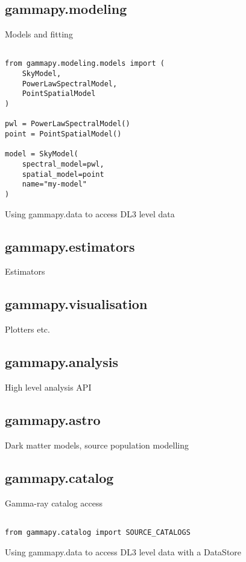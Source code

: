 \subsection{gammapy.modeling}
Models and fitting

\begin{listing}
\begin{verbatim}

from gammapy.modeling.models import (
	SkyModel,
	PowerLawSpectralModel,
	PointSpatialModel
)

pwl = PowerLawSpectralModel()
point = PointSpatialModel()

model = SkyModel(
	spectral_model=pwl,
	spatial_model=point
	name="my-model"
)
\end{verbatim}
\caption{Using gammapy.data to access DL3 level data}
\label{codeexample:maker}
\end{listing}


\subsection{gammapy.estimators}
Estimators

\subsection{gammapy.visualisation}
Plotters etc.

\subsection{gammapy.analysis}
High level analysis API

\subsection{gammapy.astro}
Dark matter models, source population modelling


\subsection{gammapy.catalog}
Gamma-ray catalog access

\begin{listing}
\begin{verbatim}

from gammapy.catalog import SOURCE_CATALOGS

\end{verbatim}
\caption{Using gammapy.data to access DL3 level data with a DataStore}
\label{codeexample:data}
\end{listing}


